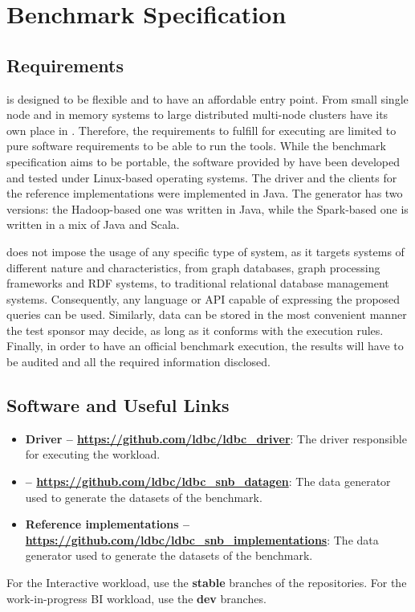\chapter{Benchmark Specification}
\label{sec:benchmark-specification}

\section{Requirements}

\ldbcsnb is designed to be flexible and to have an affordable entry point. From small single node and in memory systems to large distributed multi-node clusters have its own place in \ldbcsnb. Therefore, the requirements to fulfill for executing \ldbcsnb are limited to pure software requirements to be able to run the tools. While the benchmark specification aims to be portable, the software provided by \ldbcsnb have been developed and tested under Linux-based operating systems. The driver and the clients for the reference implementations were implemented in Java. The generator has two versions: the Hadoop-based one was written in Java, while the Spark-based one is written in a mix of Java and Scala.

\ldbcsnb does not impose the usage of any specific type of system, as it targets systems of different nature and characteristics, from graph databases, graph processing frameworks and RDF systems, to traditional relational database management systems. Consequently, any language or API capable of expressing the proposed queries can be used. Similarly, data can be stored in the most convenient manner the test sponsor may decide, as long as it conforms with the execution rules. Finally, in order to have an official benchmark execution, the results will have to be audited and all the required information disclosed.

\section{Software and Useful Links}

\begin{itemize}
    \item \textbf{Driver -- \url{https://github.com/ldbc/ldbc_driver}}: The driver responsible for executing the \ldbcsnb workload.
    \item \textbf{\datagen{} -- \url{https://github.com/ldbc/ldbc_snb_datagen}}: The data generator used to generate the datasets of the benchmark.
    \item \textbf{Reference implementations -- \url{https://github.com/ldbc/ldbc_snb_implementations}}: The data generator used to generate the datasets of the benchmark.
\end{itemize}

For the Interactive workload, use the \textbf{stable} branches of the repositories.
For the work-in-progress BI workload, use the \textbf{dev} branches.
